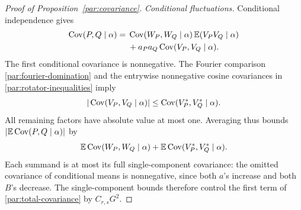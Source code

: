 \begin{proof}[Proof of Proposition~\ref{par:covariance}]
\emph{Conditional fluctuations.}
Conditional independence gives
\begin{align*}
 \operatorname{Cov}(P,Q\mid\alpha)
  ={}&\operatorname{Cov}(W_P,W_Q\mid\alpha)\,
                             \mathbb E(V_PV_Q\mid\alpha)\\
    &+a_Pa_Q\operatorname{Cov}(V_P,V_Q\mid\alpha).
\end{align*}
The first conditional covariance is nonnegative. The Fourier comparison
\eqref{par:fourier-domination} and the entrywise nonnegative cosine
covariances in \eqref{par:rotator-inequalities} imply
\[
 |\operatorname{Cov}(V_P,V_Q\mid\alpha)|
               \le\operatorname{Cov}(V_P^*,V_Q^*\mid\alpha).
\]
All remaining factors have absolute value at most one. Averaging thus
bounds $|\mathbb E\operatorname{Cov}(P,Q\mid\alpha)|$ by
\[
 \mathbb E\operatorname{Cov}(W_P,W_Q\mid\alpha)
       +\mathbb E\operatorname{Cov}(V_P^*,V_Q^*\mid\alpha).
\]
Each summand is at most its full single-component covariance: the
omitted covariance of conditional means is nonnegative, since both
$a$'s increase and both $B$'s decrease. The single-component bounds
therefore control the first term of \eqref{par:total-covariance}
by $C_{r,s}G^2$.


\end{proof}
